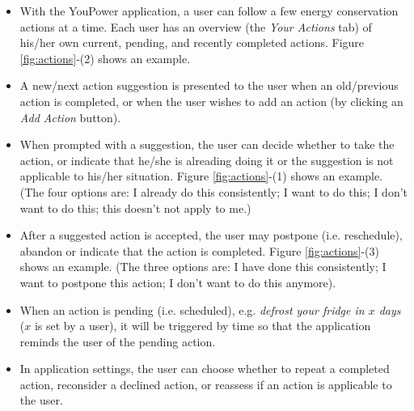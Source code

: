 \begin{itemize}
\item With the YouPower application, a user can follow a few energy conservation actions at a time. Each user has an overview (the \textit{Your Actions} tab) of his/her own current, pending, and recently completed actions. Figure \ref{fig:actions}-(2) shows an example. 
\item A new/next action suggestion is presented to the user when an old/previous action is completed, or when the user wishes to add an action (by clicking an \textit{Add Action} button). 
\item When prompted with a suggestion, the user can decide whether to take the action, or indicate that he/she is alreading doing it or the suggestion is not applicable to his/her situation. Figure \ref{fig:actions}-(1) shows an example. (The four options are: I already do this consistently; I want to do this; I don't want to do this; this doesn't not apply to me.) 
\item After a suggested action is accepted, the user may postpone (i.e. reschedule), abandon or indicate that the action is completed. Figure \ref{fig:actions}-(3) shows an example. (The three options are: I have done this consistently; I want to postpone this action; I don't want to do this anymore). 
\item When an action is pending (i.e. scheduled), e.g. \textit{defrost your fridge in $x$ days} ($x$ is set by a user), it will be triggered by time so that the application reminds the user of the pending action. 
\item In application settings, the user can choose whether to repeat a completed action, reconsider a declined action, or reassess if an action is applicable to the user.
\end{itemize}
